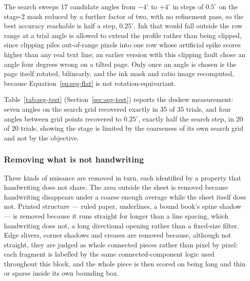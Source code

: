 The search sweeps 17 candidate angles from $-4^\circ$ to $+4^\circ$ in steps of $0.5^\circ$ on the stage-2 mask reduced by a further factor of two, with no refinement pass, so the best accuracy reachable is half a step, $0.25^\circ$. Ink that would fall outside the row range at a trial angle is allowed to extend the profile rather than being clipped, since clipping piles out-of-range pixels into one row whose artificial spike scores higher than any real text line; an earlier version with this clipping fault chose an angle four degrees wrong on a tilted page. Only once an angle is chosen is the page itself rotated, bilinearly, and the ink mask and ratio image recomputed, because Equation~\ref{eq:seg-flat} is not rotation-equivariant.

Table~\ref{tab:seg-test} (Section~\ref{sec:seg-test}) reports the deskew measurement: seven angles on the search grid recovered exactly in 35 of 35 trials, and four angles between grid points recovered to $0.25^\circ$, exactly half the search step, in 20 of 20 trials, showing the stage is limited by the coarseness of its own search grid and not by the objective.

\subsubsection{Removing what is not handwriting}
\label{sec:seg-cleanup}

Three kinds of nuisance are removed in turn, each identified by a property that handwriting does not share. The area outside the sheet is removed because handwriting disappears under a coarse enough average while the sheet itself does not. Printed structure --- ruled paper, underlines, a bound book's spine shadow --- is removed because it runs straight for longer than a line spacing, which handwriting does not, a long directional opening rather than a fixed-size filter. Edge slivers, corner shadows and creases are removed because, although not straight, they are judged as whole connected pieces rather than pixel by pixel: each fragment is labelled by the same connected-component logic used throughout this block, and the whole piece is then scored on being long and thin or sparse inside its own bounding box.

